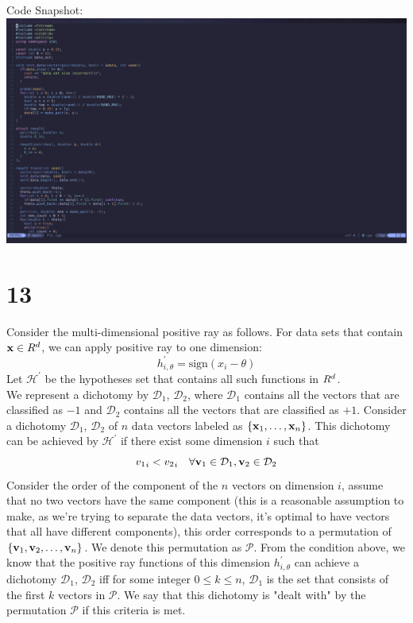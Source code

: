 \documentclass[11pt]{article}
\let\mathbb\relax
\theoremstyle{definition}
\begin{document}
Code Snapshot: \\ 
\includegraphics[width =\textwidth]{P12code.png}
\newpage
\section*{13}
Consider the multi-dimensional positive ray as follows. For data sets that contain $\vb{x} \in \mathbb{R}^d$, we can apply positive ray to one dimension: 
\[
  h^\prime_{i, \theta} = \text{sign}(x_i - \theta)
\]
Let $\mathcal{H}^\prime$ be the hypotheses set that contains all such functions in $\mathbb{R}^d$. \\ 
We represent a dichotomy by $\mathcal{D}_1$, $\mathcal{D}_2$, where $\mathcal{D}_1$ contains all the vectors that are classified as $-1$ and $\mathcal{D}_2$ contains all the vectors that are classified as $+1$.
Consider a dichotomy $\mathcal{D}_1$, $\mathcal{D}_2$ of $n$ data vectors labeled as $\{\vb{x}_1,\dots,\vb{x}_n\}$. This dichotomy can be achieved by $\mathcal{H}^\prime$ if there exist some dimension $i$ such that 
\[
  {v_1}_{i} < {v_2}_{i} \quad \forall \vb{v}_1\in \mathcal{D}_1, \vb{v}_2\in \mathcal{D}_2
\]
Consider the order of the component of the $n$ vectors on dimension $i$, assume that no two vectors have the same component (this is a reasonable assumption to make, as we're trying to separate the data vectors, it's optimal to have vectors that all have different components), this order corresponds to a permutation of $\{\vb{v}_1, \vb{v}_2,\dots,\vb{v}_n\}$. We denote this permutation as $\mathcal{P}$.
From the condition above, we know that the positive ray functions of this dimension $h^\prime_{i, \theta}$ can achieve a dichotomy $\mathcal{D}_1$, $\mathcal{D}_2$ iff for some integer $0 \leq k \leq n$, $\mathcal{D}_1$ is the set that consists of the first $k$ vectors in $\mathcal{P}$. We say that this dichotomy is "dealt with" by the permutation $\mathcal{P}$ if this criteria is met.
\end{document}
